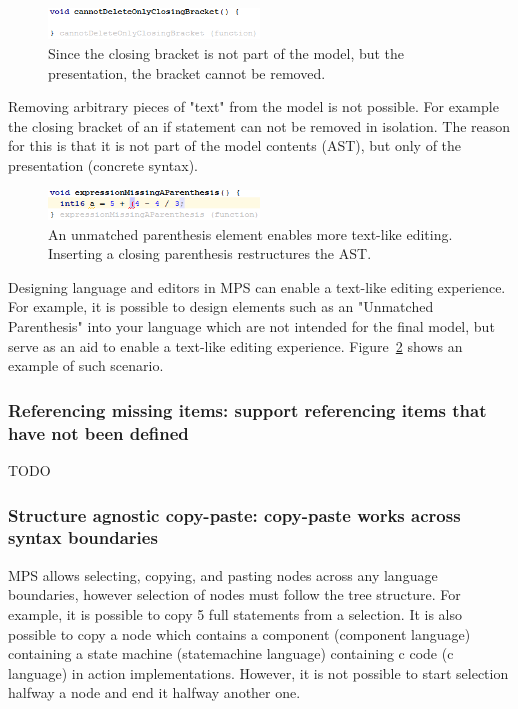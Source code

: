 \documentclass[preprint,numbers,10pt]{sigplanconf}
\begin{document}
\begin{figure}[H]
	\centering
	\includegraphics[width=0.50\textwidth]{screens/CannotDeleteConcreteSyntaxElements.png}
	\caption{Since the closing bracket is not part of the model, but the presentation, the bracket cannot be removed.}
	\label{fig:CannotDeleteConcreteSyntaxElements}
\end{figure}
Removing arbitrary pieces of "text" from the model is not possible. For example the closing bracket of an if statement can not be removed in isolation. The reason for this is that it is not part of the model contents (AST), but only of the presentation (concrete syntax).

\begin{figure}[H]
	\centering
	\includegraphics[width=0.5\textwidth]{screens/UnmatchedParenthesis.png}
	\caption{An unmatched parenthesis element enables more text-like editing. Inserting a closing parenthesis restructures the AST.}
	\label{fig:UnmatchedParenthesis}
\end{figure}

Designing language and editors in MPS can enable a text-like editing experience. For example, 
 it is possible to design elements such as an "Unmatched Parenthesis" into your language which are not intended for the final model, but serve as an aid to enable a text-like editing experience.
 Figure~\ref{fig:UnmatchedParenthesis} shows an example of such scenario.


\subsubsection{Referencing missing items: support referencing items that have not been defined}
TODO

\subsubsection{Structure agnostic copy-paste: copy-paste works across syntax boundaries}
MPS allows selecting, copying, and pasting nodes across any language boundaries, however selection of nodes must follow the tree structure. For example, it is possible to copy 5 full statements from a selection. It is also possible to copy a node which contains a component (component language) containing a state machine (statemachine language) containing c code (c language) in action implementations. However, it is not possible to start selection halfway a node and end it halfway another one.
\end{document}
